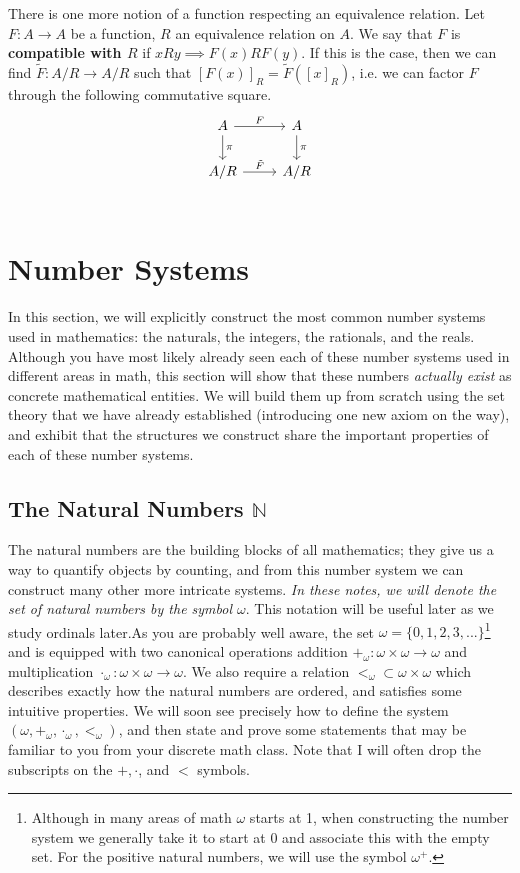 \documentclass[11pt, oneside]{article}   	%
\theoremstyle{definition}
\begin{document}
There is one more notion of a function respecting an equivalence relation. Let $F : A\rightarrow A$ be a function, $R$ an 
equivalence relation on $A$. We say that $F$ is \textbf{compatible with $R$} if $xRy\implies F(x) R F(y)$. If this is the case, 
then we can find $\tilde F : A / R\rightarrow A / R$ such that $[F(x)]_R = \tilde F([x]_R)$, i.e. we can factor $F$ through the 
following commutative square.
\[
	\begin{tikzcd}
		A \arrow[r, "F"] \arrow[d, "\pi"] & A \arrow[d, "\pi"] \\
		A / R \arrow[r, "\tilde F"] & A / R \\
	\end{tikzcd}
\]

\newpage
\section{Number Systems}

In this section, we will explicitly construct the most common number systems used in mathematics: the naturals, the integers, 
the rationals, and the reals. Although you have most likely already seen each of these number systems used in different areas 
in math, this section will show that these numbers \textit{actually exist} as concrete mathematical entities. We will build 
them up from scratch using the set theory that we have already established (introducing one new axiom on the way), and 
exhibit that the structures we construct share the important properties of each of these number systems.

\subsection{The Natural Numbers $\mathbb N$}

The natural numbers are the building blocks of all mathematics; they give us a way to quantify objects by counting, and from 
this number system we can construct many other more intricate systems. \textit{In these notes, we will denote the set of natural 
numbers by the symbol $\omega$}. This notation will be useful later as we study ordinals later.As you are probably well aware, 
the set $\omega = \{0, 1, 2, 3, ...\}$\footnote{Although in many areas of math $\omega$ starts at 1, when constructing the 
number system we generally take it to start at 0 and associate this with the empty set. For the positive natural numbers, we 
will use the symbol $\omega^+$.} and is equipped with two canonical operations
addition $+_\omega : \omega\times\omega\rightarrow\omega$ and multiplication $\cdot_\omega : 
\omega\times\omega\rightarrow\omega$. We also require a relation $<_\omega\subset\omega\times\omega$ which describes 
exactly how the natural numbers are ordered, and satisfies some intuitive properties.
We will soon see precisely how to define the system $(\omega, +_\omega, \cdot_\omega, <_\omega)$, and then state and 
prove some statements that may be familiar to you from your discrete math class. Note that I will often drop the subscripts on 
the $+, \cdot$, and $<$ symbols.
\end{document}
